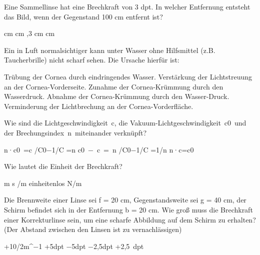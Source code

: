 \documentclass[11pt]{exam}
\begin{document}
\setlength{\voffset}{-0.5in}
\setlength{\headsep}{5pt}

\hspace{2mm}
 \hspace{5mm}
\vspace{4mm}

\begin{questions}

\question Eine Sammellinse hat eine Brechkraft von 3 dpt. In welcher Entfernung entsteht das Bild, wenn der Gegenstand 100 cm entfernt ist?

\begin{choices}
	 cm
	 cm
	,3 cm
	\choice 150cm
	 cm
\end{choices}

\vspace{3mm}\question Ein in Luft normalsichtiger kann unter Wasser ohne Hilfsmittel (z.B. Taucherbrille) nicht scharf sehen. Die Ursache hierfür ist:

\begin{choices}
	\choice Trübung der Cornea durch eindringendes Wasser.
	\choice Verstärkung der Lichtstreuung an der Cornea-Vorderseite.
	\choice Zunahme der Cornea-Krümmung durch den Wasserdruck.
	\choice Abnahme der Cornea-Krümmung durch den Wasser-Druck.
	\choice Verminderung der Lichtbrechung an der Cornea-Vorderfläche.
\end{choices}

\vspace{3mm}\question Wie sind die Lichtgeschwindigkeit c, die Vakuum-Lichtgeschwindigkeit c0 und der Brechungsindex n miteinander verknüpft?

\begin{choices}
	\choice n·c0 =c
	 /C0−1/C =n
	\choice c0 − c = n
	 /C0−1/C =1/n
	\choice n·c=c0
\end{choices}

\vspace{3mm}\question Wie lautet die Einheit der Brechkraft?

\begin{choices}
	\choice m
	\choice s
	/m
	\choice einheitenlos
	\choice N/m
\end{choices}

\vspace{3mm}\question Die Brennweite einer Linse sei f = 20 cm, Gegenstandsweite sei g = 40 cm, der Schirm befindet sich in der Entfernung b = 20 cm. Wie groß muss die Brechkraft einer Korrekturlinse sein, um eine scharfe Abbildung auf dem Schirm zu erhalten? (Der Abstand zwischen den Linsen ist zu vernachlässigen)

\begin{choices}
	\choice +10/2m^−1
	\choice +5dpt
	\choice −5dpt
	\choice −2,5dpt
	\choice +2,5 dpt
\end{choices}

\vspace{3mm}\end{questions}
\end{document}
